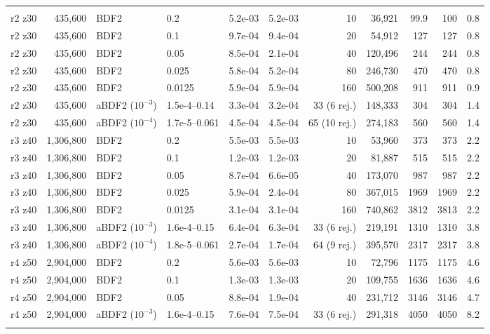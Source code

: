 \begin{longtable}{>{\footnotesize}l>{\footnotesize}r>{\footnotesize}l>{\footnotesize}l>{\footnotesize}r>{\footnotesize}r>{\footnotesize}r>{\footnotesize}r>{\footnotesize}r>{\footnotesize}r>{\footnotesize}r}
\noalign{\smallskip}
\multicolumn{11}{l}{\textbf{GARNET CPU}} \\
r2 z30 & 435,600 & BDF2 & 0.2 & 5.2e-03 & 5.2e-03 & 10 & 36,921 & 99.9 & 100 & 0.8 \\
r2 z30 & 435,600 & BDF2 & 0.1 & 9.7e-04 & 9.4e-04 & 20 & 54,912 & 127 & 127 & 0.8 \\
r2 z30 & 435,600 & BDF2 & 0.05 & 8.5e-04 & 2.1e-04 & 40 & 120,496 & 244 & 244 & 0.8 \\
r2 z30 & 435,600 & BDF2 & 0.025 & 5.8e-04 & 5.2e-04 & 80 & 246,730 & 470 & 470 & 0.8 \\
r2 z30 & 435,600 & BDF2 & 0.0125 & 5.9e-04 & 5.9e-04 & 160 & 500,208 & 911 & 911 & 0.9 \\
r2 z30 & 435,600 & aBDF2 ($10^{-3}$) & 1.5e-4--0.14 & 3.3e-04 & 3.2e-04 & 33 (6 rej.) & 148,333 & 304 & 304 & 1.4 \\
r2 z30 & 435,600 & aBDF2 ($10^{-4}$) & 1.7e-5--0.061 & 4.5e-04 & 4.5e-04 & 65 (10 rej.) & 274,183 & 560 & 560 & 1.4 \\
r3 z40 & 1,306,800 & BDF2 & 0.2 & 5.5e-03 & 5.5e-03 & 10 & 53,960 & 373 & 373 & 2.2 \\
r3 z40 & 1,306,800 & BDF2 & 0.1 & 1.2e-03 & 1.2e-03 & 20 & 81,887 & 515 & 515 & 2.2 \\
r3 z40 & 1,306,800 & BDF2 & 0.05 & 8.7e-04 & 6.6e-05 & 40 & 173,070 & 987 & 987 & 2.2 \\
r3 z40 & 1,306,800 & BDF2 & 0.025 & 5.9e-04 & 2.4e-04 & 80 & 367,015 & 1969 & 1969 & 2.2 \\
r3 z40 & 1,306,800 & BDF2 & 0.0125 & 3.1e-04 & 3.1e-04 & 160 & 740,862 & 3812 & 3813 & 2.2 \\
r3 z40 & 1,306,800 & aBDF2 ($10^{-3}$) & 1.6e-4--0.15 & 6.4e-04 & 6.3e-04 & 33 (6 rej.) & 219,191 & 1310 & 1310 & 3.8 \\
r3 z40 & 1,306,800 & aBDF2 ($10^{-4}$) & 1.8e-5--0.061 & 2.7e-04 & 1.7e-04 & 64 (9 rej.) & 395,570 & 2317 & 2317 & 3.8 \\
r4 z50 & 2,904,000 & BDF2 & 0.2 & 5.6e-03 & 5.6e-03 & 10 & 72,796 & 1175 & 1175 & 4.6 \\
r4 z50 & 2,904,000 & BDF2 & 0.1 & 1.3e-03 & 1.3e-03 & 20 & 109,755 & 1636 & 1636 & 4.6 \\
r4 z50 & 2,904,000 & BDF2 & 0.05 & 8.8e-04 & 1.9e-04 & 40 & 231,712 & 3146 & 3146 & 4.7 \\
r4 z50 & 2,904,000 & aBDF2 ($10^{-3}$) & 1.6e-4--0.15 & 7.6e-04 & 7.5e-04 & 33 (6 rej.) & 291,318 & 4050 & 4050 & 8.2 \\
\noalign{\smallskip}

\end{longtable}
